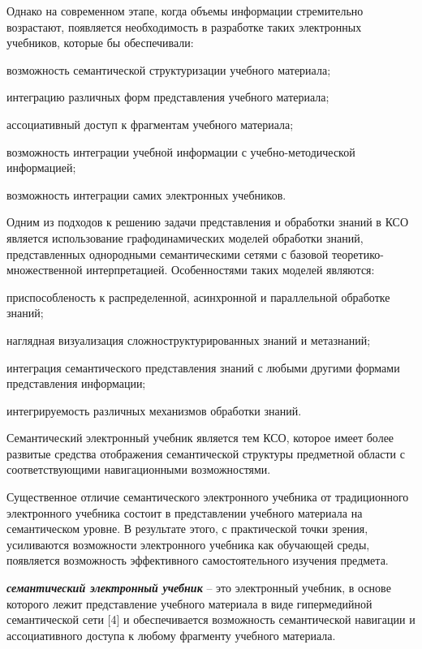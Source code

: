 Однако на современном этапе, когда объемы информации стремительно возрастают, появляется необходимость в разработке таких электронных учебников, которые бы обеспечивали:

\begin{textitemize}
	\item возможность семантической структуризации учебного материала;
	\item интеграцию различных форм представления учебного материала;
	\item ассоциативный доступ к фрагментам учебного материала;
	\item возможность интеграции учебной информации с учебно-методической информацией;
	\item возможность интеграции самих электронных учебников.
\end{textitemize}

Одним из подходов к решению задачи представления и обработки знаний в КСО является использование графодинамических моделей обработки знаний, представленных однородными семантическими сетями с базовой теоретико-множественной интерпретацией. Особенностями таких моделей являются:

\begin{textitemize}
	\item приспособленость к распределенной, асинхронной и параллельной обработке знаний;
	\item наглядная визуализация сложноструктурированных знаний и метазнаний;
	\item интеграция семантического представления знаний с любыми другими формами представления информации;
	\item интегрируемость различных механизмов обработки знаний.
\end{textitemize}

Семантический электронный учебник является тем КСО, которое имеет более развитые средства отображения семантической структуры предметной области с соответствующими навигационными возможностями.

Существенное отличие семантического электронного учебника от традиционного электронного учебника состоит в представлении учебного материала на семантическом уровне. В результате этого, с практической точки зрения, усиливаются возможности электронного учебника как обучающей среды, появляется возможность эффективного самостоятельного изучения предмета.

\textbf{\textit{семантический электронный учебник}} -- это электронный учебник, в основе которого лежит представление учебного материала в виде гипермедийной семантической сети [4] и обеспечивается возможность семантической навигации и ассоциативного доступа к любому фрагменту учебного материала.

